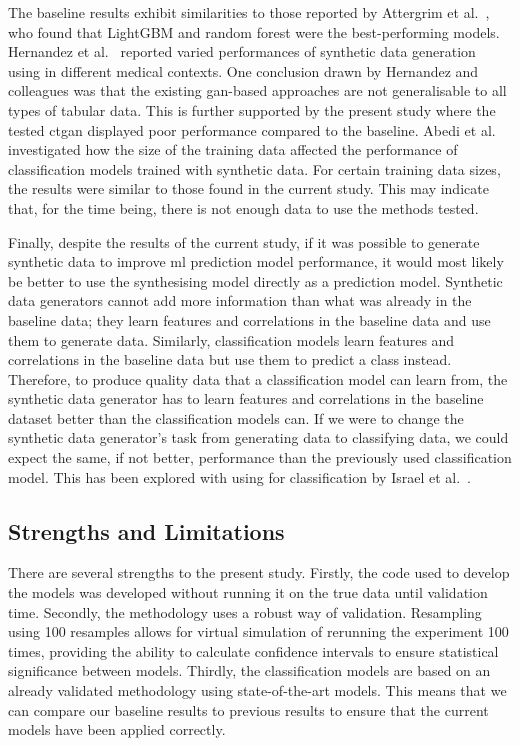 \documentclass[12pt, a4paper]{article}
\begin{document}
The baseline results exhibit similarities to those reported by Attergrim et al.~\cite{attergrim_predicting_2023}, who
found that LightGBM and random forest were the best-performing models. Hernandez et al.~\cite{hernandez_synthetic_2022}
reported varied performances of synthetic data generation using  in different medical contexts. One
conclusion drawn by Hernandez and colleagues was that the existing \acrlong{gan}-based approaches are not generalisable
to all types of tabular data. This is further supported by the present study where the tested \acrshort{ctgan}
displayed poor performance compared to the baseline. Abedi et al.~\cite{abedi_gan-based_2022} investigated how the size
of the training data affected the performance of classification models trained with synthetic data. For certain
training data sizes, the results were similar to those found in the current study. This may indicate that, for the time
being, there is not enough data to use the methods tested.

Finally, despite the results of the current study, if it was possible to generate synthetic data to improve
\acrshort{ml} prediction model performance, it would most likely be better to use the synthesising model directly as a
prediction model. Synthetic data generators cannot add more information than what was already in the baseline data;
they learn features and correlations in the baseline data and use them to generate data. Similarly, classification
models learn features and correlations in the baseline data but use them to predict a class instead. Therefore, to
produce quality data that a classification model can learn from, the synthetic data generator has to learn features and
correlations in the baseline dataset better than the classification models can. If we were to change the synthetic data
generator's task from generating data to classifying data, we could expect the same, if not better, performance than
the previously used classification model. This has been explored with using  for classification by
Israel et al.~\cite{israel_generative_2017}.

\subsection{Strengths and Limitations}
There are several strengths to the present study. Firstly, the code used to develop the models was developed without
running it on the true data until validation time. Secondly, the methodology uses a robust way of validation.
Resampling using 100 resamples allows for virtual simulation of rerunning the experiment 100 times, providing the
ability to calculate confidence intervals to ensure statistical significance between models. Thirdly, the
classification models are based on an already validated methodology using state-of-the-art models. This means that we
can compare our baseline results to previous results to ensure that the current models have been applied correctly.
\end{document}
